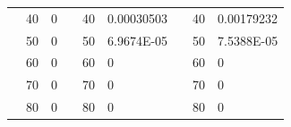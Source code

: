 \begin{table}[]
\begin{tabular}{|cclcclccl|}
\rowcolor[HTML]{DDFDFF} 
\multicolumn{1}{|c|}{\cellcolor[HTML]{FFFFC7}}                                & \multicolumn{1}{c|}{\cellcolor[HTML]{DDFDFF}40}        & \multicolumn{1}{l|}{\cellcolor[HTML]{DDFDFF}0}          & \multicolumn{1}{c|}{\cellcolor[HTML]{FFFFC7}}                                & \multicolumn{1}{c|}{\cellcolor[HTML]{DDFDFF}40}        & \multicolumn{1}{l|}{\cellcolor[HTML]{DDFDFF}0.00030503} & \multicolumn{1}{c|}{\cellcolor[HTML]{FFFFC7}}                                & \multicolumn{1}{c|}{\cellcolor[HTML]{DDFDFF}40}        & 0.00179232 \\ \cline{2-3} \cline{5-6} \cline{8-9} 
\rowcolor[HTML]{DAE8FC} 
\multicolumn{1}{|c|}{\cellcolor[HTML]{FFFFC7}}                                & \multicolumn{1}{c|}{\cellcolor[HTML]{DAE8FC}50}        & \multicolumn{1}{l|}{\cellcolor[HTML]{DAE8FC}0}          & \multicolumn{1}{c|}{\cellcolor[HTML]{FFFFC7}}                                & \multicolumn{1}{c|}{\cellcolor[HTML]{DAE8FC}50}        & \multicolumn{1}{l|}{\cellcolor[HTML]{DAE8FC}6.9674E-05} & \multicolumn{1}{c|}{\cellcolor[HTML]{FFFFC7}}                                & \multicolumn{1}{c|}{\cellcolor[HTML]{DAE8FC}50}        & 7.5388E-05 \\ \cline{2-3} \cline{5-6} \cline{8-9} 
\rowcolor[HTML]{DDFDFF} 
\multicolumn{1}{|c|}{\cellcolor[HTML]{FFFFC7}}                                & \multicolumn{1}{c|}{\cellcolor[HTML]{DDFDFF}60}        & \multicolumn{1}{l|}{\cellcolor[HTML]{DDFDFF}0}          & \multicolumn{1}{c|}{\cellcolor[HTML]{FFFFC7}}                                & \multicolumn{1}{c|}{\cellcolor[HTML]{DDFDFF}60}        & \multicolumn{1}{l|}{\cellcolor[HTML]{DDFDFF}0}          & \multicolumn{1}{c|}{\cellcolor[HTML]{FFFFC7}}                                & \multicolumn{1}{c|}{\cellcolor[HTML]{DDFDFF}60}        & 0          \\ \cline{2-3} \cline{5-6} \cline{8-9} 
\rowcolor[HTML]{DAE8FC} 
\multicolumn{1}{|c|}{\cellcolor[HTML]{FFFFC7}}                                & \multicolumn{1}{c|}{\cellcolor[HTML]{DAE8FC}70}        & \multicolumn{1}{l|}{\cellcolor[HTML]{DAE8FC}0}          & \multicolumn{1}{c|}{\cellcolor[HTML]{FFFFC7}}                                & \multicolumn{1}{c|}{\cellcolor[HTML]{DAE8FC}70}        & \multicolumn{1}{l|}{\cellcolor[HTML]{DAE8FC}0}          & \multicolumn{1}{c|}{\cellcolor[HTML]{FFFFC7}}                                & \multicolumn{1}{c|}{\cellcolor[HTML]{DAE8FC}70}        & 0          \\ \cline{2-3} \cline{5-6} \cline{8-9} 
\rowcolor[HTML]{DDFDFF} 
\multicolumn{1}{|c|}{\cellcolor[HTML]{FFFFC7}}                                & \multicolumn{1}{c|}{\cellcolor[HTML]{DDFDFF}80}        & \multicolumn{1}{l|}{\cellcolor[HTML]{DDFDFF}0}          & \multicolumn{1}{c|}{\cellcolor[HTML]{FFFFC7}}                                & \multicolumn{1}{c|}{\cellcolor[HTML]{DDFDFF}80}        & \multicolumn{1}{l|}{\cellcolor[HTML]{DDFDFF}0}          & \multicolumn{1}{c|}{\cellcolor[HTML]{FFFFC7}}                                & \multicolumn{1}{c|}{\cellcolor[HTML]{DDFDFF}80}        & 0          \\ \cline{2-3} \cline{5-6} \cline{8-9} 

\end{tabular}
\end{table}
